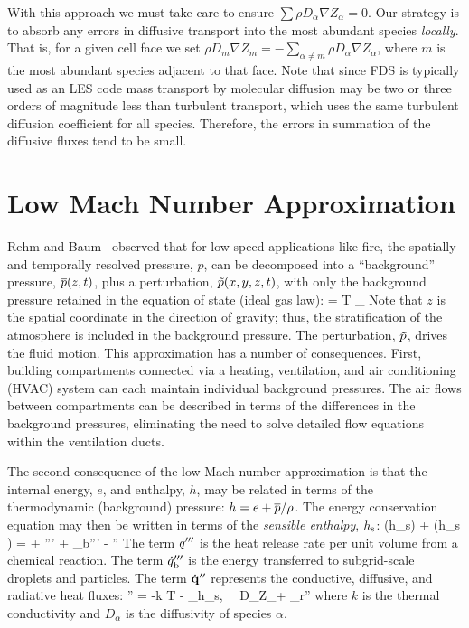 With this approach we must take care to ensure $\sum \rho D_\alpha \nabla Z_\alpha = 0$.  Our strategy is to absorb any errors in diffusive transport into the most abundant species \emph{locally}.  That is, for a given cell face we set $\rho D_m \nabla Z_m = -\sum_{\alpha\ne m} \rho D_\alpha \nabla Z_\alpha$, where $m$ is the most abundant species adjacent to that face.  Note that since FDS is typically used as an LES code mass transport by molecular diffusion may be two or three orders of magnitude less than turbulent transport, which uses the same turbulent diffusion coefficient for all species. Therefore, the errors in summation of the diffusive fluxes tend to be small.

\section{Low Mach Number Approximation}

Rehm and Baum~\cite{Rehm:1} observed that for low speed applications like fire, the spatially and temporally resolved pressure, $p$, can be decomposed into a ``background'' pressure, $\overline{p}(z,t)$, plus a perturbation, $\tilde{p}(x,y,z,t)$, with only the background pressure retained in the equation of state (ideal gas law):
\be \bp = \rho T \R \sum_\alpha  {} \equiv {}  \label{basicstate1} \ee
Note that $z$ is the spatial coordinate in the direction of gravity; thus, the stratification of the atmosphere is included in the background pressure. The perturbation, $\tilde{p}$, drives the fluid motion. This approximation has a number of consequences. First, building compartments connected via a heating, ventilation, and air conditioning (HVAC) system can each maintain individual background pressures. The air flows between compartments can be
described in terms of the differences in the background pressures, eliminating the need to solve detailed flow equations within the ventilation ducts.

The second consequence of the low Mach number approximation is that the internal energy, $e$, and enthalpy, $h$, may be related in terms of the thermodynamic (background) pressure: $h = e + \overline{p}/\rho$.  The energy conservation equation may then be written in terms of the {\em sensible enthalpy}, $h_{\rm s}$:
\be {}(\rho h_{\rm s}) + \nabla\!\cdot (\rho h_{\rm s} \bu) =  + \dq''' + \dq_{\rm b}'''
        - \nabla\!\cdot \dbq'' \label{energy} \ee
The term
$\dot{q}'''$ is the heat release rate per unit volume from a chemical reaction.
The term $\dot{q}_{\rm b}'''$ is the energy transferred to subgrid-scale droplets and particles.
The term $\dot{\mathbf{q}}''$ represents the conductive, diffusive, and radiative heat fluxes:
\be
   \dbq'' = -k \nabla T - \sum_\alpha h_{\rm s,\alpha} \, \rho \, D_\alpha \nabla Z_\alpha + \dbq_{\rm r}''
\ee
where $k$ is the thermal conductivity and $D_\alpha$ is the diffusivity of species $\alpha$.

